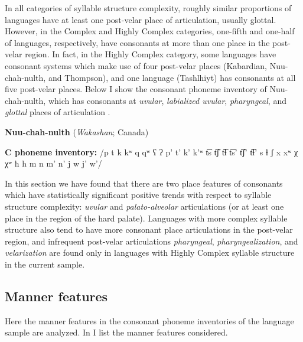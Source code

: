   In all categories of syllable structure complexity, roughly similar proportions of languages have at least one post-velar place of articulation, usually glottal. However, in the Complex and Highly Complex categories, one-fifth and one-half of languages, respectively, have consonants at more than one place in the post-velar region. In fact, in the Highly Complex category, some languages have consonant systems which make use of four post-velar places (Kabardian, Nuu-chah-nulth, and Thompson), and one language (Tashlhiyt) has consonants at all five post-velar places. Below I show the consonant phoneme inventory of Nuu-chah-nulth, which has consonants at \textit{uvular}, \textit{labialized uvular}, \textit{pharyngeal}, and \textit{glottal} places of articulation .

\ea\label{ex:4.33}
  \textbf{Nuu-chah-nulth} (\textit{Wakashan}; Canada)

\textbf{C phoneme inventory:} /p t k kʷ q qʷ ʕ ʔ p’ t’ k’ k’ʷ t͡s t͡ʃ t͡ɬ t͡s’ t͡ʃ’ t͡ɬ’ s ɬ ʃ x xʷ χ χʷ ħ h m n m’ n’ j w j’ w’/
\z

  In this section we have found that there are two place features of consonants which have statistically significant positive trends with respect to syllable structure complexity: \textit{uvular} and \textit{palato-alveolar} articulations (or at least one place in the region of the hard palate). Languages with more complex syllable structure also tend to have more consonant place articulations in the post-velar region, and infrequent post-velar articulations \textit{pharyngeal}, \textit{pharyngealization}, and \textit{velarization} are found only in languages with Highly Complex syllable structure in the current sample.

\subsection{Manner features}\label{sec:4.4.5}

  Here the manner features in the consonant phoneme inventories of the language sample are analyzed. In  I list the manner features considered.

